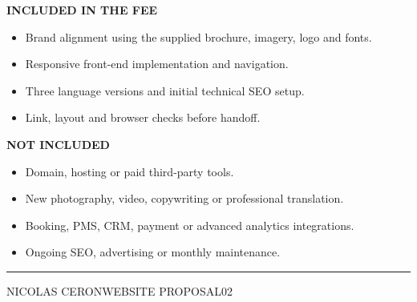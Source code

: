 \documentclass[10pt,oneside]{article}
\newcommand{\eyebrow}[1]{%
  {\sffamily\fontsize{7}{8}\selectfont\bfseries\color{Forest}\MakeUppercase{#1}}%
}
\newcommand{\pagefooter}[1]{%
  \vfill
  {\color{Line}\rule{\textwidth}{0.35pt}}\par\vspace{1.6mm}
  {\sffamily\fontsize{6.5}{8}\selectfont\color{Stone}
    NICOLAS CERON\hfill WEBSITE PROPOSAL\hfill #1}%
}
\begin{document}
\vspace{1mm}
\begin{minipage}[t]{0.48\textwidth}
  \begin{softbox}
    \eyebrow{Included in the fee}\par\vspace{1.5mm}
    {\sffamily\fontsize{8}{9.8}\selectfont\color{Text}
      \begin{itemize}
        \item Brand alignment using the supplied brochure, imagery, logo and fonts.
        \item Responsive front-end implementation and navigation.
        \item Three language versions and initial technical SEO setup.
        \item Link, layout and browser checks before handoff.
      \end{itemize}}
  \end{softbox}
\end{minipage}
\hfill
\begin{minipage}[t]{0.48\textwidth}
  \begin{softbox}
    \eyebrow{Not included}\par\vspace{1.5mm}
    {\sffamily\fontsize{8}{9.8}\selectfont\color{Text}
      \begin{itemize}
        \item Domain, hosting or paid third-party tools.
        \item New photography, video, copywriting or professional translation.
        \item Booking, PMS, CRM, payment or advanced analytics integrations.
        \item Ongoing SEO, advertising or monthly maintenance.
      \end{itemize}}
  \end{softbox}
\end{minipage}

\pagefooter{02}
\end{document}
